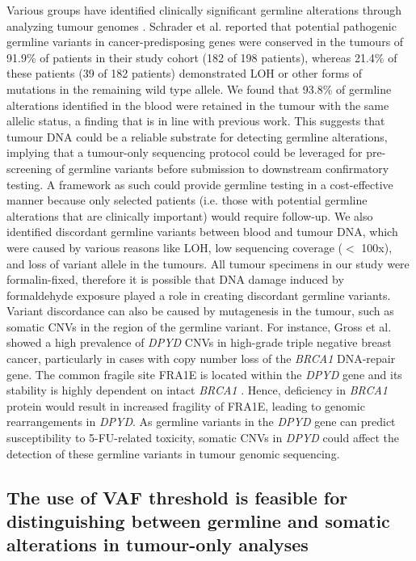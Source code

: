 Various groups have identified clinically significant germline alterations through analyzing tumour genomes \cite{Schrader2015, Meric-Bernstam2016, Jones2015a, WcWhinney2009}. Schrader et al. \cite{Schrader2015} reported that potential pathogenic germline variants in cancer-predisposing genes were conserved in the tumours of 91.9\% of patients in their study cohort (182 of 198 patients), whereas 21.4\% of these patients (39 of 182 patients) demonstrated LOH or other forms of mutations in the remaining wild type allele. We found that 93.8\% of germline alterations identified in the blood were retained in the tumour with the same allelic status, a finding that is in line with previous work. This suggests that tumour DNA could be a reliable substrate for detecting germline alterations, implying that a tumour-only sequencing protocol could be leveraged for pre-screening of germline variants before submission to downstream confirmatory testing. A framework as such could provide germline testing in a cost-effective manner because only selected patients (i.e. those with potential germline alterations that are clinically important) would require follow-up. We also identified discordant germline variants between blood and tumour DNA, which were caused by various reasons like LOH, low sequencing coverage ($<$ 100x), and loss of variant allele in the tumours. All tumour specimens in our study were formalin-fixed, therefore it is possible that DNA damage induced by formaldehyde exposure played a role in creating discordant germline variants. Variant discordance can also be caused by mutagenesis in the tumour, such as somatic CNVs in the region of the germline variant. For instance, Gross et al. \cite{Gross2013} showed a high prevalence of \textit{DPYD} CNVs in high-grade triple negative breast cancer, particularly in cases with copy number loss of the \textit{BRCA1} DNA-repair gene. The common fragile site FRA1E is located within the \textit{DPYD} gene and its stability is highly dependent on intact \textit{BRCA1} \cite{Arlt2004}. Hence, deficiency in \textit{BRCA1} protein would result in increased fragility of FRA1E, leading to genomic rearrangements in \textit{DPYD}. As germline variants in the \textit{DPYD} gene can predict susceptibility to 5-FU-related toxicity, somatic CNVs in \textit{DPYD} could affect the detection of these germline variants in tumour genomic sequencing.

\subsection{The use of VAF threshold is feasible for distinguishing between germline and somatic alterations in tumour-only analyses}

